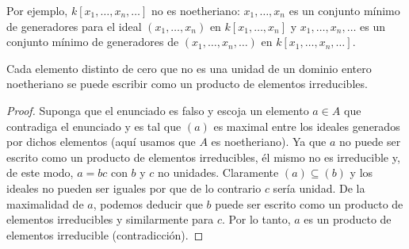 Por ejemplo, $k[x_1,\ldots,x_n,\ldots]$ no es noetheriano: $x_1, \ldots, x_n$ es un conjunto mínimo de generadores para el ideal $(x_1,\ldots,x_n)$ en $k[x_1,\ldots,x_n]$ y $x_1,\ldots,x_n,\ldots$ es un conjunto mínimo de generadores de $(x_1,\ldots,x_n,\ldots)$ en $k[x_1,\ldots,x_n,\ldots]$.

\begin{proposition}
  Cada elemento distinto de cero que no es una unidad de un dominio entero noetheriano se puede escribir como un producto de elementos irreducibles.
\end{proposition}
\begin{proof}
  Suponga que el enunciado es falso y escoja un elemento $a\in A$ que contradiga el enunciado y es tal que $(a)$ es maximal entre los ideales generados por dichos elementos (aquí usamos que $A$ es noetheriano). Ya que $a$ no puede ser escrito como un producto de elementos irreducibles, él mismo no es irreducible y, de este modo, $a = bc$ con $b$ y $c$ no unidades. Claramente $(a) \subseteq (b) $ y los ideales no pueden ser iguales por que de lo contrario $c$ sería unidad. De la maximalidad de $a$, podemos deducir que $b$ puede ser escrito como un producto de elementos irreducibles y similarmente para $c$. Por lo tanto, $a$ es un producto de elementos irreducible (contradicción).
\end{proof}